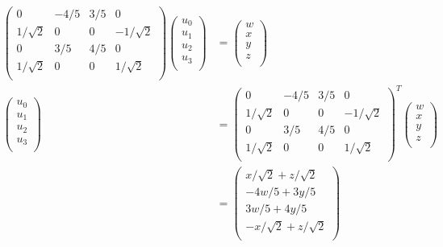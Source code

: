 \documentclass[12pt]{article}
\newenvironment{problem}[2][Problem]{\begin{trivlist}
\item[\hskip \labelsep {\bfseries #1}\hskip \labelsep {\bfseries #2.}]}{\end{trivlist}}
\begin{document}
\begin{problem}{1.b}
\end{problem}
\begin{align*}
\left( \begin{array}{cccc}
0 & -4/5 & 3/5 & 0 \\
1/\sqrt{2} & 0 & 0 & -1/\sqrt{2}\\ 
0 & 3/5 & 4/5 & 0\\
1/\sqrt{2} & 0 & 0 & 1/\sqrt{2} \\
\end{array}
\right)
\left( \begin{array}{c}
u_0\\ 
u_1\\ 
u_2\\ 
u_3\\ 
\end{array}
\right) &= 
\left( \begin{array}{c}
w\\ 
x\\ 
y\\ 
z\\ 
\end{array}
\right)\\
\left( \begin{array}{c}
u_0\\ 
u_1\\ 
u_2\\ 
u_3\\ 
\end{array}
\right) &=
\left( \begin{array}{cccc}
0 & -4/5 & 3/5 & 0 \\
1/\sqrt{2} & 0 & 0 & -1/\sqrt{2}\\ 
0 & 3/5 & 4/5 & 0\\
1/\sqrt{2} & 0 & 0 & 1/\sqrt{2} \\
\end{array}
\right)^T
\left( \begin{array}{c}
w\\ 
x\\ 
y\\ 
z\\ 
\end{array}
\right)\\
&= \left( \begin{array}{c}
x/\sqrt{2} + z/\sqrt{2}\\ 
-4w/5 + 3y/5\\ 
3w/5 + 4y/5\\ 
-x/\sqrt{2} + z/\sqrt{2}\\ 
\end{array}
\right)
\end{align*}
\end{document}
